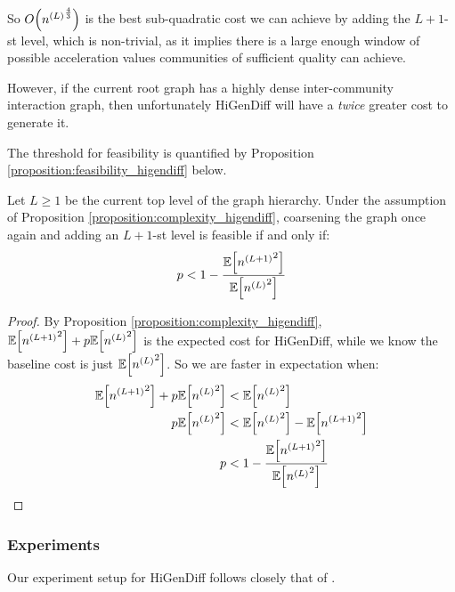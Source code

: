 So $O\mathopen{}\left({n^{\mathopen{}\left(L\right)}}^{\frac{4}{3}}\right)$ is the best sub-quadratic cost we can achieve by adding the $L+1$-st level, which is non-trivial, as it implies there is a large enough window of possible acceleration values communities of sufficient quality can achieve. 

However, if the current root graph has a highly dense inter-community interaction graph, then unfortunately HiGenDiff will have a \emph{twice} greater cost to generate it. 

The threshold for feasibility is quantified by Proposition \ref{proposition:feasibility_higendiff} below.

\begin{proposition}
\label{proposition:feasibility_higendiff}
     Let $L \geq 1$ be the current top level of the graph hierarchy. Under the assumption of Proposition \ref{proposition:complexity_higendiff}, coarsening the graph once again and adding an $L+1$-st level is feasible if and only if:
     \begin{equation}
            p < 1 - \frac{\mathbb{E}\mathopen{}\left[{n^{\mathopen{}\left(L+1\right)}}^2\right]}{\mathbb{E}\mathopen{}\left[{n^{\mathopen{}\left(L\right)}}^2\right]}
     \end{equation}
\end{proposition}
\begin{proof}
    By Proposition \ref{proposition:complexity_higendiff}, $\mathbb{E}\mathopen{}\left[{n^{\mathopen{}\left(L+1\right)}}^2\right] + p \mathbb{E}\mathopen{}\left[{n^{\mathopen{}\left(L\right)}}^2\right]$ is the expected cost for HiGenDiff, while we know the baseline cost is just $\mathbb{E}\mathopen{}\left[{n^{\mathopen{}\left(L\right)}}^2\right]$. So we are faster in expectation when:
    \begin{align}
        \begin{split}
            \mathbb{E}\mathopen{}\left[{n^{\mathopen{}\left(L+1\right)}}^2\right] + p \mathbb{E}\mathopen{}\left[{n^{\mathopen{}\left(L\right)}}^2\right] &< \mathbb{E}\mathopen{}\left[{n^{\mathopen{}\left(L\right)}}^2\right] \\
            p \mathbb{E}\mathopen{}\left[{n^{\mathopen{}\left(L\right)}}^2\right] &< \mathbb{E}\mathopen{}\left[{n^{\mathopen{}\left(L\right)}}^2\right] - \mathbb{E}\mathopen{}\left[{n^{\mathopen{}\left(L+1\right)}}^2\right]  \\
            p &< 1 - \frac{\mathbb{E}\mathopen{}\left[{n^{\mathopen{}\left(L+1\right)}}^2\right]}{\mathbb{E}\mathopen{}\left[{n^{\mathopen{}\left(L\right)}}^2\right]}
        \end{split}
    \end{align}
\end{proof}

\subsubsection{Experiments}

Our experiment setup for HiGenDiff follows closely that of \cite{karami_multi-resolution_2024}. 

